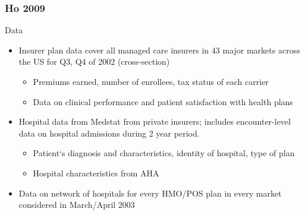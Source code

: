 \documentclass[xcolor=pdftex,dvipsnames,table,mathserif]{beamer}
\begin{document}
\begin{frame}
\frametitle{Ho 2009}

Data
\begin{itemize}
\item Insurer plan data cover all managed care insurers in 43 major markets across the US for Q3, Q4 of 2002 (cross-section)
\begin{itemize}
\item Premiums earned, number of enrollees, tax status of each carrier
\item Data on clinical performance and patient satisfaction with health plans
\end{itemize}
\item Hospital data from Medstat from private insurers; includes encounter-level data on hospital admissions during 2 year period.
\begin{itemize}
\item Patient`s diagnosis and characteristics, identity of hospital, type of plan
\item Hospital characteristics from AHA
\end{itemize}
\item Data on network of hospitals for every HMO/POS plan in every market considered in March/April 2003

\end{itemize}
\end{frame}
\end{document}
